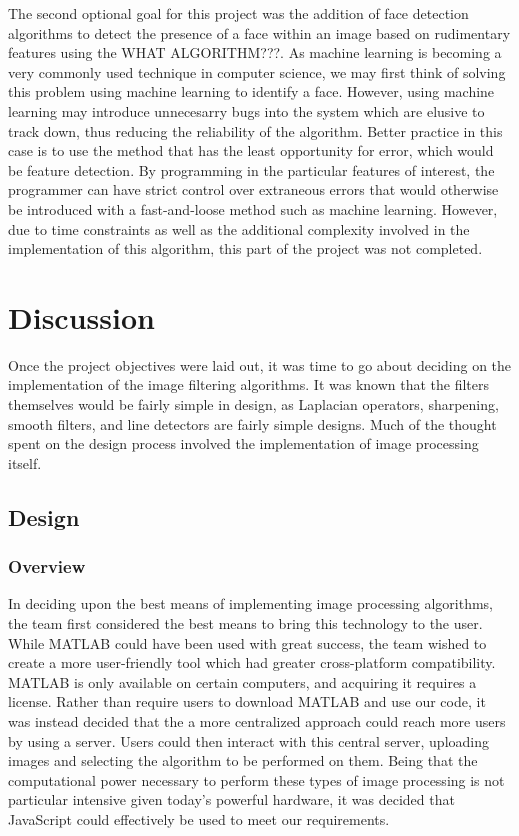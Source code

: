 \documentclass{article}
\let\Oldsection\section
\renewcommand{\section}{\FloatBarrier\Oldsection}
\let\Oldsubsection\subsection
\renewcommand{\subsection}{\FloatBarrier\Oldsubsection}
\let\Oldsubsubsection\subsubsection
\renewcommand{\subsubsection}{\FloatBarrier\Oldsubsubsection}
\begin{document}
  The second optional goal for this project was the addition of face detection algorithms to detect the presence of a face within an image based on rudimentary features using the WHAT ALGORITHM???. As machine learning is becoming a very commonly used technique in computer science, we may first think of solving this problem using machine learning to identify a face. However, using machine learning may introduce unnecesarry bugs into the system which are elusive to track down, thus reducing the reliability of the algorithm. Better practice in this case is to use the method that has the least opportunity for error, which would be feature detection. By programming in the particular features of interest, the programmer can have strict control over extraneous errors that would otherwise be introduced with a fast-and-loose method such as machine learning. However, due to time constraints as well as the additional complexity involved in the implementation of this algorithm, this part of the project was not completed.

  \newpage

  \section{Discussion}

  Once the project objectives were laid out, it was time to go about deciding on the implementation of the image filtering algorithms. It was known that the filters themselves would be fairly simple in design, as Laplacian operators, sharpening, smooth filters, and line detectors are fairly simple designs. Much of the thought spent on the design process involved the implementation of image processing itself.

  \subsection{Design}

  \subsubsection{Overview}

  In deciding upon the best means of implementing image processing algorithms, the team first considered the best means to bring this technology to the user. While MATLAB could have been used with great success, the team wished to create a more user-friendly tool which had greater cross-platform compatibility. MATLAB is only available on certain computers, and acquiring it requires a license. Rather than require users to download MATLAB and use our code, it was instead decided that the a more centralized approach could reach more users by using a server. Users could then interact with this central server, uploading images and selecting the algorithm to be performed on them. Being that the computational power necessary to perform these types of image processing is not particular intensive given today's powerful hardware, it was decided that JavaScript  could effectively be used to meet our requirements. 
  
\end{document}
